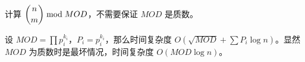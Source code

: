计算 $\dbinom{n}{m}\bmod MOD$，不需要保证 $MOD$ 是质数。

设 $MOD=\prod p_i^{k_i}$，$P_i=p_i^{k_i}$，那么时间复杂度 $O(\sqrt{MOD}+\sum P_i\log n)$。显然 $MOD$ 为质数时是最坏情况，时间复杂度 $O(MOD\log n)$。